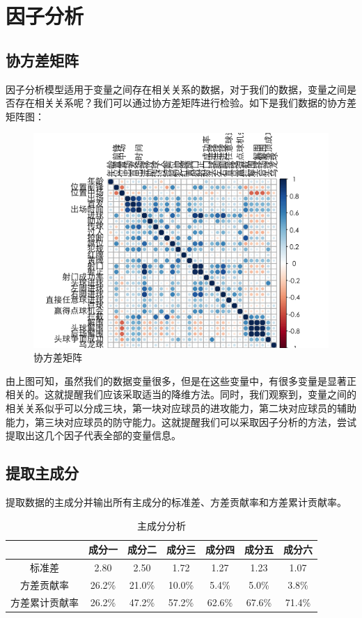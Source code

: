 \documentclass[12pt,a4paper,onecolumn]{article}
\begin{document}
\section{因子分析}

\subsection{协方差矩阵}

因子分析模型适用于变量之间存在相关关系的数据，对于我们的数据，变量之间是否存在相关关系呢？我们可以通过协方差矩阵进行检验。如下是我们数据的协方差矩阵图：

\begin{figure}[H]
\centering
\includegraphics[width=400pt]{协方差矩阵.png}
\caption{\small{协方差矩阵}}
\end{figure}

由上图可知，虽然我们的数据变量很多，但是在这些变量中，有很多变量是显著正相关的。这就提醒我们应该采取适当的降维方法。同时，我们观察到，变量之间的相关关系似乎可以分成三块，第一块对应球员的进攻能力，第二块对应球员的辅助能力，第三块对应球员的防守能力。这就提醒我们可以采取因子分析的方法，尝试提取出这几个因子代表全部的变量信息。

\subsection{提取主成分}

提取数据的主成分并输出所有主成分的标准差、方差贡献率和方差累计贡献率。

\begin{table}[H]
\centering
\caption{主成分分析}
\begin{tabular}{ccccccc}
  \hline
     & 成分一 & 成分二 & 成分三 & 成分四 & 成分五 & 成分六 \\\hline
    标准差 & 2.80 & 2.50 & 1.72 & 1.27 & 1.23 & 1.07 \\
    方差贡献率 & 26.2\% & 21.0\% & 10.0\% & 5.4\% & 5.0\% & 3.8\% \\
    方差累计贡献率 & 26.2\% & 47.2\% & 57.2\% & 62.6\% & 67.6\% & 71.4\% \\
    \hline
  \end{tabular}
\end{table}
\end{document}
